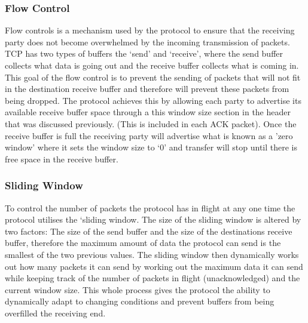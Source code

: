 \subsubsection*{Flow Control}
Flow controls is a mechanism used by the protocol to ensure that the receiving party does not become overwhelmed by the incoming transmission of packets. TCP has two types of buffers the `send' and `receive', where the send buffer collects what data is going out and the receive buffer collects what is coming in. This goal of the flow control is to prevent the sending of packets that will not fit in the destination receive buffer and therefore will prevent these packets from being dropped. The protocol achieves this by allowing each party to advertise its available receive buffer space through a this window size section in the header that was discussed previously. (This is included in each ACK packet). Once the receive buffer is full the receiving party will advertise what is known as a 'zero window' where it sets the window size to `0' and transfer will stop until there is free space in the receive buffer.

\subsubsection*{Sliding Window}
To control the number of packets the protocol has in flight at any one time the protocol utilises the `sliding window. The size of the sliding window is altered by two factors: The size of the send buffer and the size of the destinations receive buffer, therefore the maximum amount of data the protocol can send is the smallest of the two previous values. The sliding window then dynamically works out how many packets it can send by working out the maximum data it can send while keeping track of the number of packets in flight (unacknowledged) and the current window size. This whole process gives the protocol the ability to dynamically adapt to changing conditions and prevent buffers from being overfilled the receiving end.


